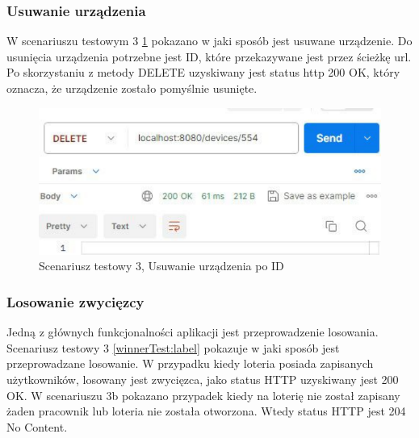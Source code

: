 \subsubsection{Usuwanie urządzenia}
W scenariuszu testowym 3 \ref{deleteTest:label} pokazano w jaki sposób jest usuwane urządzenie. Do usunięcia urządzenia potrzebne jest ID, które przekazywane jest przez ścieżkę url. Po skorzystaniu z metody DELETE uzyskiwany jest status http 200 OK, który oznacza, że urządzenie zostało pomyślnie usunięte.


\begin{figure}[h]
		\centering
    \includegraphics[width=0.48\linewidth]{rys06/postmanTest/delete.pdf}
    \caption{Scenariusz testowy 3, Usuwanie urządzenia po ID}
    \label{deleteTest:label}
\end{figure}


\subsubsection{Losowanie zwycięzcy}

Jedną z głównych funkcjonalności aplikacji jest przeprowadzenie losowania. Scenariusz testowy 3 \ref{winnerTest:label} pokazuje w jaki sposób jest przeprowadzane losowanie. W przypadku kiedy loteria posiada zapisanych użytkowników, losowany jest zwycięzca, jako status HTTP uzyskiwany jest 200 OK. W scenariuszu 3b pokazano przypadek kiedy na loterię nie został zapisany żaden pracownik lub loteria nie została otworzona. Wtedy status HTTP jest 204 No Content. 


